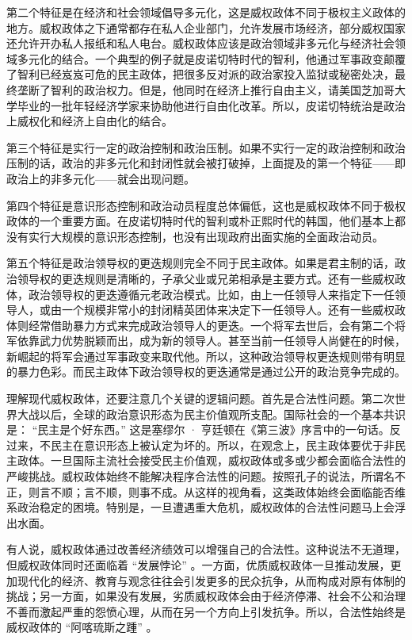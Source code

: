 第二个特征是在经济和社会领域倡导多元化，这是威权政体不同于极权主义政体的地方。威权政体之下通常都存在私人企业部门，允许发展市场经济，部分威权国家还允许开办私人报纸和私人电台。威权政体应该是政治领域非多元化与经济社会领域多元化的结合。一个典型的例子就是皮诺切特时代的智利，他通过军事政变颠覆了智利已经岌岌可危的民主政体，把很多反对派的政治家投入监狱或秘密处决，最终垄断了智利的政治权力。但是，他同时在经济上推行自由主义，请美国芝加哥大学毕业的一批年轻经济学家来协助他进行自由化改革。所以，皮诺切特统治是政治上威权化和经济上自由化的结合。

第三个特征是实行一定的政治控制和政治压制。如果不实行一定的政治控制和政治压制的话，政治的非多元化和封闭性就会被打破掉，上面提及的第一个特征——即政治上的非多元化——就会出现问题。

第四个特征是意识形态控制和政治动员程度总体偏低，这也是威权政体不同于极权政体的一个重要方面。在皮诺切特时代的智利或朴正熙时代的韩国，他们基本上都没有实行大规模的意识形态控制，也没有出现政府出面实施的全面政治动员。

第五个特征是政治领导权的更迭规则完全不同于民主政体。如果是君主制的话，政治领导权的更迭规则是清晰的，子承父业或兄弟相承是主要方式。还有一些威权政体，政治领导权的更迭遵循元老政治模式。比如，由上一任领导人来指定下一任领导人，或由一个规模非常小的封闭精英团体来决定下一任领导人。还有一些威权政体则经常借助暴力方式来完成政治领导人的更迭。一个将军去世后，会有第二个将军依靠武力优势脱颖而出，成为新的领导人。甚至当前一任领导人尚健在的时候，新崛起的将军会通过军事政变来取代他。所以，这种政治领导权更迭规则带有明显的暴力色彩。而民主政体下政治领导权的更迭通常是通过公开的政治竞争完成的。

理解现代威权政体，还要注意几个关键的逻辑问题。首先是合法性问题。第二次世界大战以后，全球的政治意识形态为民主价值观所支配。国际社会的一个基本共识是： “民主是个好东西。” 这是塞缪尔 · 亨廷顿在《第三波》序言中的一句话。反过来，不民主在意识形态上被认定为坏的。所以，在观念上，民主政体要优于非民主政体。一旦国际主流社会接受民主价值观，威权政体或多或少都会面临合法性的严峻挑战。威权政体始终不能解决程序合法性的问题。按照孔子的说法，所谓名不正，则言不顺；言不顺，则事不成。从这样的视角看，这类政体始终会面临能否维系政治稳定的困境。特别是，一旦遭遇重大危机，威权政体的合法性问题马上会浮出水面。

有人说，威权政体通过改善经济绩效可以增强自己的合法性。这种说法不无道理，但威权政体同时还面临着 “发展悖论” 。一方面，优质威权政体一旦推动发展，更加现代化的经济、教育与观念往往会引发更多的民众抗争，从而构成对原有体制的挑战；另一方面，如果没有发展，劣质威权政体会由于经济停滞、社会不公和治理不善而激起严重的怨愤心理，从而在另一个方向上引发抗争。所以，合法性始终是威权政体的 “阿喀琉斯之踵” 。

